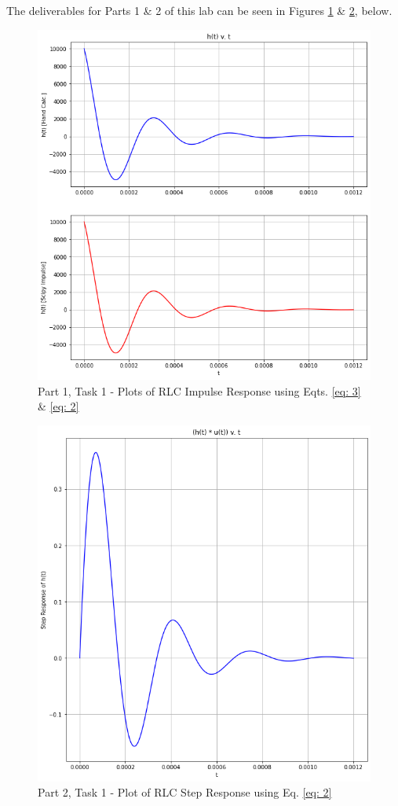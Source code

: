 \documentclass[12pt]{report}
\begin{document}
The deliverables for Parts 1 \& 2 of this lab can be seen in Figures \ref{fig: p1t1} \& \ref{fig: p2t1}, below.
\\
\begin{figure}[h!]
  \centering
  \includegraphics[scale=0.5]{p1t1.png}
  \caption{Part 1, Task 1 - Plots of RLC Impulse Response using Eqts. \eqref{eq: 3} \& \eqref{eq: 2}}
  \label{fig: p1t1}
\end{figure}
\begin{figure}[h!]
  \centering
  \includegraphics[scale=0.5]{p2t1.png}
  \caption{Part 2, Task 1 - Plot of RLC Step Response using Eq. \eqref{eq: 2}}
  \label{fig: p2t1}
\end{figure}
\end{document}
